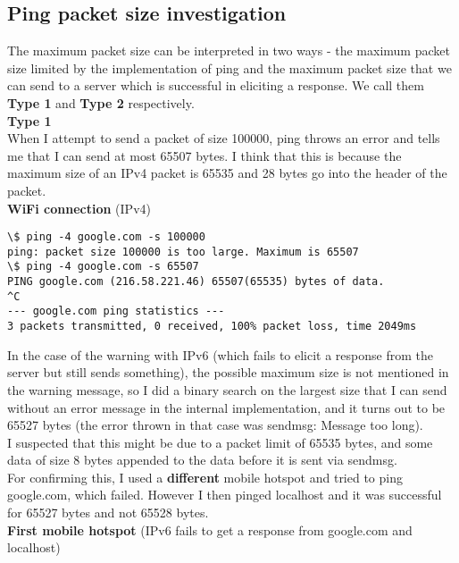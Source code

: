 \documentclass[a4paper]{article}
\newcommand{\nl}{\vspace{0.2cm}\\}
\begin{document}
\subsection{Ping packet size investigation}

The maximum packet size can be interpreted in two ways - the maximum packet size limited by the implementation of ping and the maximum packet size that we can send to a server which is successful in eliciting a response. We call them \textbf{Type 1} and \textbf{Type 2} respectively.\nl

\textbf{Type 1}\nl

When I attempt to send a packet of size 100000, ping throws an error and tells me that I can send at most 65507 bytes. I think that this is because the maximum size of an IPv4 packet is 65535 and 28 bytes go into the header of the packet.\nl
\textbf{WiFi connection} (IPv4)

\begin{lstlisting}
\$ ping -4 google.com -s 100000
ping: packet size 100000 is too large. Maximum is 65507
\$ ping -4 google.com -s 65507
PING google.com (216.58.221.46) 65507(65535) bytes of data.
^C
--- google.com ping statistics ---
3 packets transmitted, 0 received, 100% packet loss, time 2049ms
\end{lstlisting}

In the case of the warning with IPv6 (which fails to elicit a response from the server but still sends something), the possible maximum size is not mentioned in the warning message, so I did a binary search on the largest size that I can send without an error message in the internal implementation, and it turns out to be 65527 bytes (the error thrown in that case was sendmsg: Message too long).\nl
I suspected that this might be due to a packet limit of 65535 bytes, and some data of size 8 bytes appended to the data before it is sent via sendmsg.\nl
For confirming this, I used a \textbf{different} mobile hotspot and tried to ping google.com, which failed. However I then pinged localhost and it was successful for 65527 bytes and not 65528 bytes.\nl
\textbf{First mobile hotspot} (IPv6 fails to get a response from google.com and localhost)
\end{document}
